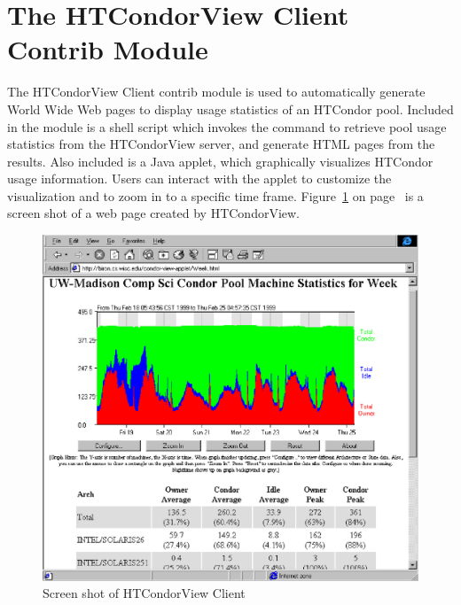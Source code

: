 \section{\label{sec:HTCondorView-Client-Install}
The HTCondorView Client Contrib Module} 

The HTCondorView Client contrib module is used to automatically generate
World Wide Web pages to display usage statistics of an HTCondor
pool.
Included in the module is a shell script which invokes the 
command to retrieve pool usage statistics from the HTCondorView server, and
generate HTML pages from the results.  
Also included is a Java applet, which graphically visualizes HTCondor 
usage information.  
Users can interact with the applet to customize the visualization and to
zoom in to a specific time frame.
Figure~\ref{fig:view-screenshot} on page~\pageref{fig:view-screenshot}
is a screen shot of a web page created by HTCondorView.  

\begin{figure}[hbt]
\centering
\includegraphics{contrib/view-screenshot.ps}
\caption{\label{fig:view-screenshot}Screen shot of HTCondorView Client}
\end{figure}

